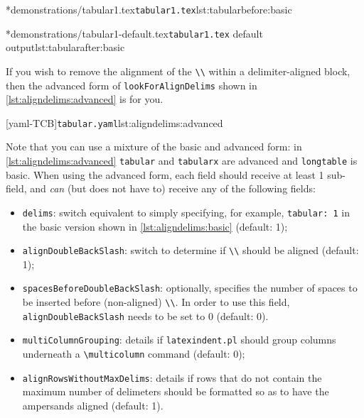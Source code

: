 	\begin{minipage}{.45\textwidth}
		\cmhlistingsfromfile[showspaces=false,showtabs=false]*{demonstrations/tabular1.tex}{\texttt{tabular1.tex}}{lst:tabularbefore:basic}
	\end{minipage}%
	\hfill
	\begin{minipage}{.45\textwidth}
		\cmhlistingsfromfile[showspaces=false,showtabs=false]*{demonstrations/tabular1-default.tex}{\texttt{tabular1.tex} default output}{lst:tabularafter:basic}
	\end{minipage}%

	If you wish to remove the alignment of the \lstinline!\\! within a delimiter-aligned block, then the advanced form of \texttt{lookForAlignDelims} shown in \cref{lst:aligndelims:advanced} is for you.

	[yaml-TCB]{\texttt{tabular.yaml}}{lst:aligndelims:advanced}

	Note that you can use a mixture of the basic and advanced form: in \cref{lst:aligndelims:advanced} \texttt{tabular} and \texttt{tabularx} are advanced and \texttt{longtable} is basic.
	When using the advanced form, each field should receive at least 1 sub-field, and \emph{can} (but does not have to) receive any of the following fields: \begin{itemize} \item \texttt{delims}: switch equivalent to simply specifying, for example, \texttt{tabular: 1} in the basic version shown in \cref{lst:aligndelims:basic} (default: 1);
		\item \texttt{alignDoubleBackSlash}: switch to determine if \lstinline!\\! should be aligned (default: 1);
		\item \texttt{spacesBeforeDoubleBackSlash}: optionally, specifies the number of spaces to be inserted before (non-aligned) \lstinline!\\!.
		      In order to use this field, \texttt{alignDoubleBackSlash} needs to be set to 0 (default: 0).
		\item {}
		      \texttt{multiColumnGrouping}: details if \texttt{latexindent.pl} should group columns underneath a \lstinline!\multicolumn! command (default: 0);
		\item {} \texttt{alignRowsWithoutMaxDelims}: details if rows that do not contain the maximum number of delimeters should be formatted so as to have the ampersands aligned (default: 1).
	\end{itemize}

